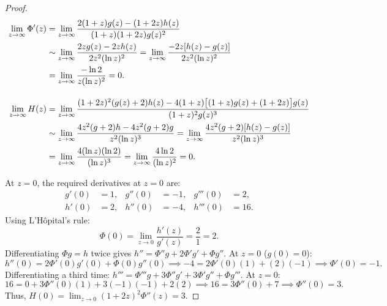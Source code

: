 \documentclass[12pt]{article}
\theoremstyle{definition}
\begin{document}
\begin{proof}
\begin{align}
\label{lim-Phi}
\lim_{z \to \infty} \Phi'(z) 
&= \lim_{z \to \infty} \frac{2(1+z)g(z) - (1+2z)h(z)}{(1+z)(1+2z)g(z)^2} \notag \\
&\sim \lim_{z \to \infty} \frac{2z g(z) - 2z h(z)}{2z^2 (\ln z)^2} 
= \lim_{z \to \infty} \frac{-2z [h(z)-g(z)]}{2z^2 (\ln z)^2} \notag \\
&= \lim_{z \to \infty} \frac{-\ln 2}{z (\ln z)^2} = 0. \\[10pt]
\label{lim-H}
\lim_{z \to \infty} H(z) 
&= \lim_{z \to \infty} \frac{(1+2z)^2 (g(z)+2)h(z) - 4(1+z)\big[(1+z)g(z) + (1+2z)\big]g(z)}{(1+z)^2 g(z)^3} \notag \\
&\sim \lim_{z \to \infty} \frac{4z^2 (g+2)h - 4z^2 (g+2)g}{z^2 (\ln z)^3} 
= \lim_{z \to \infty} \frac{4z^2 (g+2)[h(z)-g(z)]}{z^2 (\ln z)^3} \notag \\
&= \lim_{z \to \infty} \frac{4 (\ln z)(\ln 2)}{(\ln z)^3} 
= \lim_{z \to \infty} \frac{4 \ln 2}{(\ln z)^2} = 0.
\end{align}

At $z=0$, the required derivatives at $z=0$ are:
\begin{align*}
    g'(0) &= 1, & g''(0) &= -1, & g'''(0) &= 2, \\
    h'(0) &= 2, & h''(0) &= -4, & h'''(0) &= 16.
\end{align*}
Using L'Hôpital's rule:
\[
\Phi(0) = \lim_{z \to 0} \frac{h'(z)}{g'(z)} = \frac{2}{1} = 2.
\]
Differentiating $\Phi g = h$ twice gives $h'' = \Phi'' g + 2\Phi' g' + \Phi g''$. At $z=0$ ($g(0)=0$):
\[
h''(0) = 2\Phi'(0)g'(0) + \Phi(0)g''(0) \implies -4 = 2\Phi'(0)(1) + (2)(-1) \implies \Phi'(0) = -1.
\]
Differentiating a third time: $h''' = \Phi''' g + 3\Phi'' g' + 3\Phi' g'' + \Phi g'''$. At $z=0$:
\[
16 = 0 + 3\Phi''(0)(1) + 3(-1)(-1) + 2(2) \implies 16 = 3\Phi''(0) + 7 \implies \Phi''(0) = 3.
\]
Thus, $H(0) = \lim_{z \to 0} (1+2z)^2 \Phi''(z) = 3$.

\end{proof}
\end{document}
